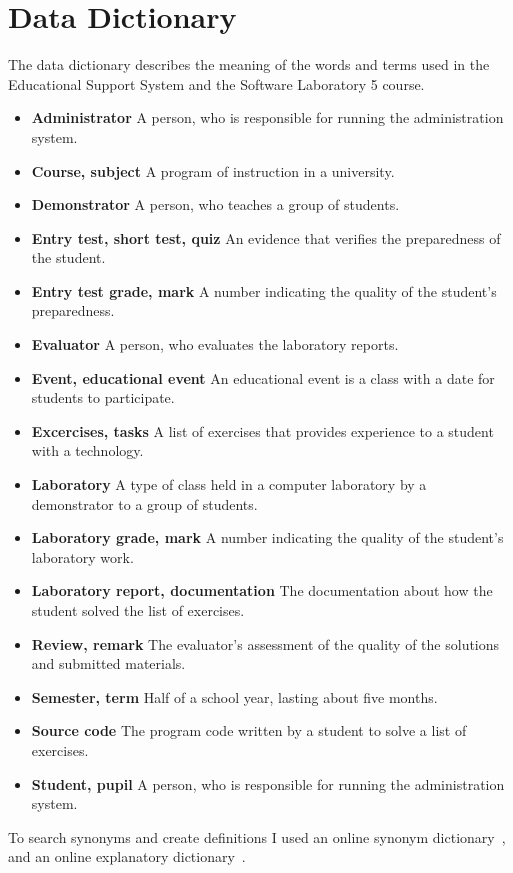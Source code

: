 \chapter{Data Dictionary}

The data dictionary describes the meaning of the words and terms used in the Educational Support System and the Software Laboratory 5 course.

\begin{itemize}
	\item \textbf{Administrator} A person, who is responsible for running the administration system.
	\item \textbf{Course, subject} A program of instruction in a university.
	\item \textbf{Demonstrator} A person, who teaches a group of students.
	\item \textbf{Entry test, short test, quiz} An evidence that verifies the preparedness of the student.
	\item \textbf{Entry test grade, mark} A number indicating the quality of the student's preparedness.
	\item \textbf{Evaluator} A person, who evaluates the laboratory reports.
	\item \textbf{Event, educational event} An educational event is a class with a date for students to participate.
	\item \textbf{Excercises, tasks} A list of exercises that provides experience to a student with a technology.
	\item \textbf{Laboratory} A type of class held in a computer laboratory by a demonstrator to a group of students.
	\item \textbf{Laboratory grade, mark} A number indicating the quality of the student's laboratory work.
	\item \textbf{Laboratory report, documentation} The documentation about how the student  solved the list of exercises.
	\item \textbf{Review, remark} The evaluator's assessment of the quality of the solutions and submitted materials.
	\item \textbf{Semester, term} Half of a school year, lasting about five months.
	\item \textbf{Source code} The program code written by a student to solve a list of exercises.
	\item \textbf{Student, pupil} A person, who is responsible for running the administration system.
\end{itemize}

To search synonyms and create definitions I used an online synonym dictionary~\cite{Thesaurus}, and an online explanatory  dictionary~\cite{Dictionary}.
